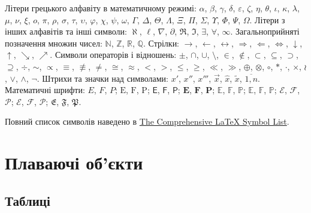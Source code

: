 \documentclass[]{iptconf}
\begin{document}
Літери грецького алфавіту в математичному режимі:
$\alpha$, $\beta$, $\gamma$, $\delta$, $\varepsilon$,
$\zeta$, $\eta$, $\theta$, $\iota$, $\kappa$, $\lambda$, $\mu$, $\nu$, $\xi$, $o$, $\pi$, $\rho$, $\sigma$, $\tau$, $\upsilon$, $\varphi$, $\chi$, $\psi$, $\omega$, $\Gamma$, $\Delta$, $\Theta$, $\Lambda$, $\Xi$, $\Pi$, $\Sigma$, $\Upsilon$, $\Phi$, $\Psi$, $\Omega$.
Літери з інших алфавітів та інші символи: $\aleph$, $\ell$, $\nabla$, $\partial$, $\Re$, $\Im$, $\exists$, $\forall$, $\infty$. Загальноприйняті позначення множин чисел: $\mathds{N}$, $\mathds{Z}$, $\mathds{R}$, $\mathds{Q}$. Стрілки: $\to$, $\leftarrow$, $\leftrightarrow$, $\Rightarrow$, $\Leftarrow$, $\Leftrightarrow$, $\downarrow$, $\uparrow$, $\searrow$, $\nearrow$.
Символи операторів і відношень: $\pm$, $\cap$, $\cup$, $\setminus$, $\in$, $\not\in$, $\subset$, $\subseteq$, $\supset$, $\supseteq$, $\div$, $\sim$, $\propto$, $\equiv$, $\not\equiv$, $\ne$, $\cong$, $\approx$, $<$, $>$, $\le$, $\ge$, $\ll$, $\gg$, $\oplus$, $\otimes$, $\circ$, $*$, $\cdot$, $\times$, $\wr$, $\vee$, $\wedge$, $\neg$.
Штрихи та значки над символами: $x'$, $x''$, $x'''$, $\vec{x}$, $\widehat{x}$, $\widetilde{x}$, $\overline{1,n}$.
Математичні шрифти: $E$, $F$, $P$; $\mathrm{E}$, $\mathrm{F}$, $\mathrm{P}$; $\mathsf{E}$, $\mathsf{F}$, $\mathsf{P}$; $\mathbf{E}$, $\mathbf{F}$, $\mathbf{P}$; $\mathbb{E}$, $\mathbb{F}$, $\mathbb{P}$; $\mathds{E}$, $\mathds{F}$, $\mathds{P}$; $\mathcal{E}$, $\mathcal{F}$, $\mathcal{P}$; $\mathscr{E}$, $\mathscr{F}$, $\mathscr{P}$; $\mathfrak{E}$, $\mathfrak{F}$, $\mathfrak{P}$.

Повний список символів наведено в \href{http://mirrors.ctan.org/info/symbols/comprehensive/symbols-a4.pdf}%
{The Comprehensive \LaTeX{} Symbol List}.





\section{Плаваючі об'єкти}





\subsection{Таблиці}
\end{document}
